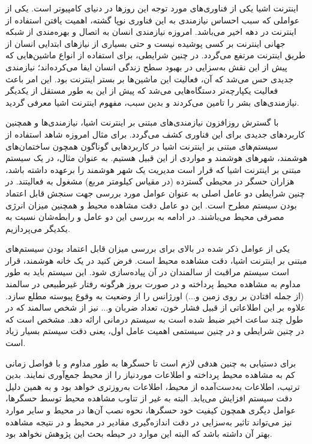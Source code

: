 اینترنت اشیا یکی از فناوری‌های مورد توجه این روزها در دنیای کامپیوتر است. یکی از عواملی که سبب احساس نیازمندی به این فناوری نوپا گشته، اهمیت یافتن استفاده از اینترنت در دهه اخیر می‌باشد. امروزه نیازمندی انسان به اتصال و بهره‌مندی از شبکه جهانی اینترنت بر کسی پوشیده نیست و حتی بسیاری از نیازهای ابتدایی انسان از طریق اینترنت مرتفع می‌گردد. در چنین شرایطی، برای استفاده از انواع ماشین‌هایی که پیش از این نقش به‌سزایی در بهبود سطح زندگی انسان ایفا می‌کرده‌اند؛ نیازمندی جدیدی حس می‌شد که آن، فعالیت این ماشین‌ها بر بستر اینترنت بود. این امر باعث فعالیت یکپارچه‌تر دستگاه‌هایی می‌شد که پیش از این به طور مستقل از یکدیگر نیازمندی‌های بشر را تامین می‌کردند و بدین سبب، مفهوم اینترنت اشیا معرفی گردید.

\par
با گسترش روزافزون نیازمندی‌های مبتنی بر اینترنت اشیا، نیازمندی‌ها و همچنین کاربردهای جدیدی برای این فناوری کشف می‌گردد. برای مثال امروزه شاهد استفاده از سیستم‌های مبتنی بر اینترنت اشیا در کاربرد‌هایی گوناگون همچون ساختمان‌های هوشمند، شهرهای هوشمند و مواردی از این قبیل هستیم. به عنوان مثال، در یک سیستم مبتنی بر اینترنت اشیا که قرار است مدیریت یک شهر هوشمند را برعهده داشته باشد، هزاران حسگر در محیطی گسترده (در مقیاس کیلومتر مربع) مشغول به فعالیتند. در چنین شرایطی دو عامل اصلی به عنوان عوامل مورد بررسی جهت سنجش قابل اعتماد بودن سیستم مطرح است. این دو عامل دقت مشاهده محیط و همچنین میزان انرژی مصرفی محیط می‌باشند. در ادامه به بررسی این دو عامل و رابطه‌شان نسبت به یکدیگر می‌پردازیم.

\par
یکی از عوامل ذکر شده در بالای برای بررسی میزان قابل اعتماد بودن سیستم‌های مبتنی بر اینترنت اشیا، دقت مشاهده محیط است. فرض کنید در یک خانه هوشمند، قرار است سیستم مراقبت از سالمندان در آن پیاده‌سازی شود. این سیستم باید به طور مداوم به مشاهده محیط پرداخته و در صورت بروز هرگونه رفتار غیرطبیعی در سالمند (از جمله افتادن بر روی زمین و...) اورژانس را از وضعیت به وقوع پیوسته مطلع سازد. علاوه بر این اطلاعاتی از قبیل فشار خون، تعداد ضربان و... نیز از شخص سالمند که در طول چند ساعت اخیر ضبط شده است به سیستم درمانی ارائه دهد. مشخص است که در چنین شرایطی و در چنین سیستمی اهمیت عامل اول، یعنی دقت سیستم بسیار زیاد است.

\par
برای دستیابی به چنین هدفی لازم است تا حسگرها به طور مداوم و با فواصل زمانی کم به مشاهده محیط پرداخته و اطلاعات موردنیاز را از محیط جمع‌آوری نمایند. بدین ترتیب، اطلاعات به‌دست‌آمده از محیط، اطلاعات به‌روزتری خواهد بود و به همین دلیل دقت سیستم افزایش می‌یابد. البته به غیر از تناوب مشاهده محیط توسط حسگر‌ها، عوامل دیگری همچون کیفیت خود حسگرها، نحوه نصب آن‌ها در محیط و سایر موارد نیز می‌تواند تاثیر به‌سزایی در دقت اندازه‌گیری مقادیر در محیط و در نتیجه مشاهده بهتر آن داشته باشد که البته این موارد در حیطه بحث این پژوهش نخواهد بود.


